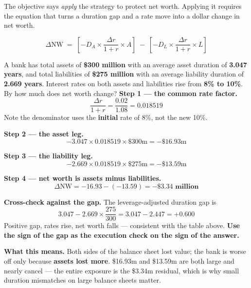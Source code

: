 \gapbadge
{}

\begin{lrgapbox}
The objective says \emph{apply} the strategy to protect net worth. Applying it requires the equation that turns a duration gap and a rate move into a dollar change in net worth.
\end{lrgapbox}

\begin{lrfmlbox}
\[ \Delta\text{NW} \;=\; \left[ -D_A \times \frac{\Delta r}{1+r} \times A \right] \;-\; \left[ -D_L \times \frac{\Delta r}{1+r} \times L \right] \]
\end{lrfmlbox}

\begin{lrexbox}
A bank has total assets of \textbf{\$300 million} with an average asset duration of \textbf{3.047 years}, and total liabilities of \textbf{\$275 million} with an average liability duration of \textbf{2.669 years}. Interest rates on both assets and liabilities rise from \textbf{8\% to 10\%}. By how much does net worth change?
\tcblower
\textbf{Step 1 --- the common rate factor.}
\[ \frac{\Delta r}{1+r} = \frac{0.02}{1.08} = 0.018519 \]
Note the denominator uses the \textbf{initial} rate of 8\%, not the new 10\%.

\textbf{Step 2 --- the asset leg.}
\[ -3.047 \times 0.018519 \times \$300\text{m} = -\$16.93\text{m} \]

\textbf{Step 3 --- the liability leg.}
\[ -2.669 \times 0.018519 \times \$275\text{m} = -\$13.59\text{m} \]

\textbf{Step 4 --- net worth is assets minus liabilities.}
\[ \Delta\text{NW} = -16.93 - (-13.59) = \mathbf{-\$3.34\text{ million}} \]

\textbf{Cross-check against the gap.} The leverage-adjusted duration gap is
\[ 3.047 - 2.669 \times \frac{275}{300} = 3.047 - 2.447 = +0.600 \]
Positive gap, rates rise, net worth falls --- consistent with the table above. \textbf{Use the sign of the gap as the execution check on the sign of the answer.}

\textbf{What this means.} Both sides of the balance sheet lost value; the bank is worse off only because \textbf{assets lost more}. \$16.93m and \$13.59m are both large and nearly cancel --- the entire exposure is the \$3.34m residual, which is why small duration mismatches on large balance sheets matter.
\end{lrexbox}

